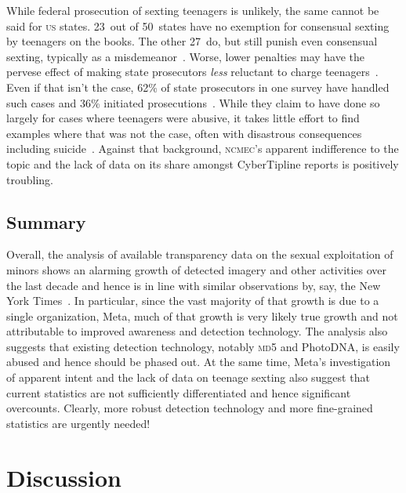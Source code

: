 \documentclass[nonacm,screen]{acmart}
\newcommand\V[1]{\textsc{\MakeLowercase{#1}}}
\begin{document}
While federal prosecution of sexting teenagers is unlikely, the same cannot be
said for \V{US} states. 23~out of 50~states have no exemption for consensual
sexting by teenagers on the books. The other 27~do, but still punish even
consensual sexting, typically as a misdemeanor~\cite{HindujaPatchin2022,
HoloydaLandessea2018,StrasburgerZimmermanea2019}. Worse, lower penalties may
have the pervese effect of making state prosecutors \emph{less} reluctant to
charge teenagers~\cite{Hasinoff2016}. Even if that isn't the case, 62\% of state
prosecutors in one survey have handled such cases and 36\% initiated
prosecutions~\cite{WalshWolakea2013}. While they claim to have done so largely
for cases where teenagers were abusive, it takes little effort to find examples
where that was not the case, often with disastrous consequences including
suicide~\cite{Dunlap2016,Feldman2020,Jouvenal2023,LorangMcNielea2016,Miller2015,
WolakFinkelhorea2012}. Against that background, \V{NCMEC}'s apparent
indifference to the topic and the lack of data on its share amongst CyberTipline
reports is positively troubling.


\subsection{Summary}

Overall, the analysis of available transparency data on the sexual exploitation
of minors shows an alarming growth of detected imagery and other activities over
the last decade and hence is in line with similar observations by, say, the New
York Times~\cite{Dance2019,KellerDance2019}. In particular, since the vast
majority of that growth is due to a single organization, Meta, much of that
growth is very likely true growth and not attributable to improved awareness and
detection technology. The analysis also suggests that existing detection
technology, notably \V{\V{MD5}} and PhotoDNA, is easily abused and hence should
be phased out. At the same time, Meta's investigation of apparent intent and the
lack of data on teenage sexting also suggest that current statistics are not
sufficiently differentiated and hence significant overcounts. Clearly, more
robust detection technology and more fine-grained statistics are urgently
needed!



\section{Discussion}
\label{sec:discussion}
\end{document}
